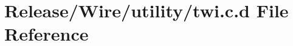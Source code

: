 \hypertarget{_release_2_wire_2utility_2twi_8c_8d}{\section{\-Release/\-Wire/utility/twi.c.\-d \-File \-Reference}
\label{_release_2_wire_2utility_2twi_8c_8d}
}
